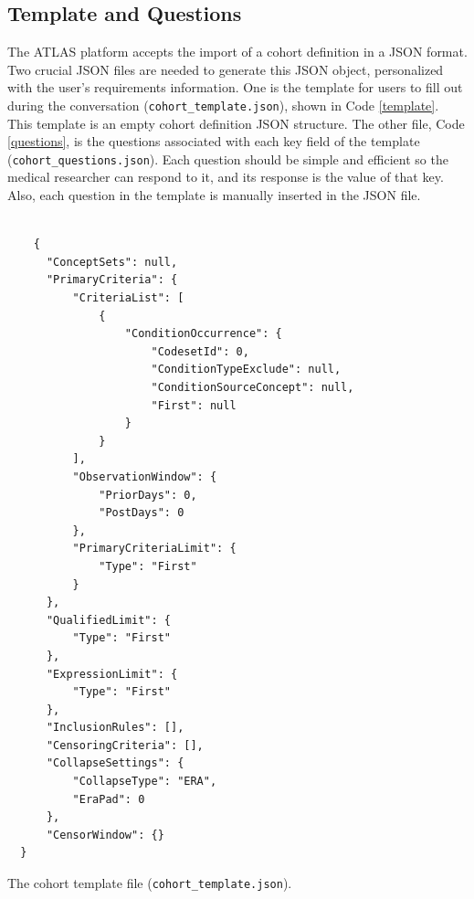 \subsection{Template and Questions}

The ATLAS platform accepts the import of a cohort definition in a JSON format. Two crucial JSON files are needed to generate this JSON object, personalized with the user's requirements information. One is the template for users to fill out during the conversation {\small\normalfont(\texttt{cohort\_template.json})}, shown in Code \ref{template}. This template is an empty cohort definition JSON structure. The other file, Code \ref{questions}, is the questions associated with each key field of the template {\small\normalfont(\texttt{cohort\_questions.json})}. Each question should be simple and efficient so the medical researcher can respond to it, and its response is the value of that key. Also, each question in the template is manually inserted in the JSON file.  

\begin{listing}[H]
  \begin{verbatim}
      
    {
      "ConceptSets": null,
      "PrimaryCriteria": {
          "CriteriaList": [
              {
                  "ConditionOccurrence": {
                      "CodesetId": 0,
                      "ConditionTypeExclude": null,
                      "ConditionSourceConcept": null,
                      "First": null
                  }
              }
          ],
          "ObservationWindow": {
              "PriorDays": 0,
              "PostDays": 0
          },
          "PrimaryCriteriaLimit": {
              "Type": "First"
          }
      },
      "QualifiedLimit": {
          "Type": "First"
      },
      "ExpressionLimit": {
          "Type": "First"
      },
      "InclusionRules": [],
      "CensoringCriteria": [],
      "CollapseSettings": {
          "CollapseType": "ERA",
          "EraPad": 0
      },
      "CensorWindow": {}
  }

  \end{verbatim}
\caption{The cohort template file {\small\normalfont(\texttt{cohort\_template.json})}.}
\label{template}
\end{listing}  

